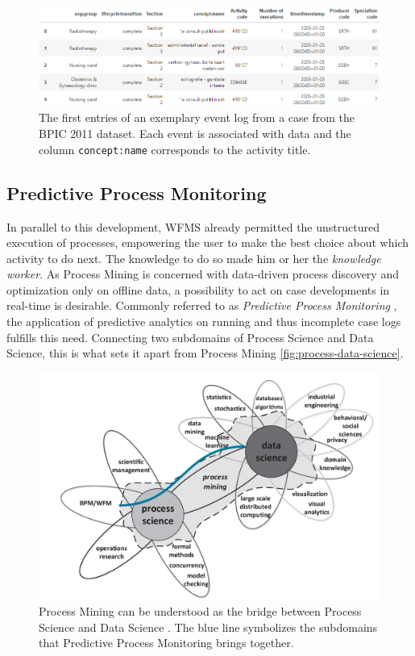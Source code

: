 \begin{figure}
    \centering
    \includegraphics[width=\textwidth]{gfx/process-log}
    \caption{The first entries of an exemplary event log from a case from the BPIC 2011 dataset\cite{BPIC2011}. Each event is associated with data and the column \texttt{concept:name} corresponds to the activity title.}
    \label{fig:process-log}
\end{figure}

\subsection{Predictive Process Monitoring}
In parallel to this development, WFMS already permitted the unstructured execution of processes, empowering the user to make the best choice about which activity to do next. The knowledge to do so made him or her the \textit{knowledge worker}.
As Process Mining is concerned with data-driven process discovery and optimization only on offline data, a possibility to act on case developments in real-time is desirable. Commonly referred to as \textit{Predictive Process Monitoring} \cite{francescomarino2015, schoenig2018}, the application of predictive analytics on running and thus incomplete case logs fulfills this need. Connecting two subdomains of Process Science and Data Science, this is what sets it apart from Process Mining \autoref{fig:process-data-science}.

\begin{figure}
    \centering
    \includegraphics[width=\textwidth]{gfx/process-data-science.png}
    \caption{Process Mining can be understood as the bridge between Process Science and Data Science \cite[p.18]{Aalst2016}. The blue line symbolizes the subdomains that Predictive Process Monitoring brings together.}
    \label{fig:process-data-science}
\end{figure}


